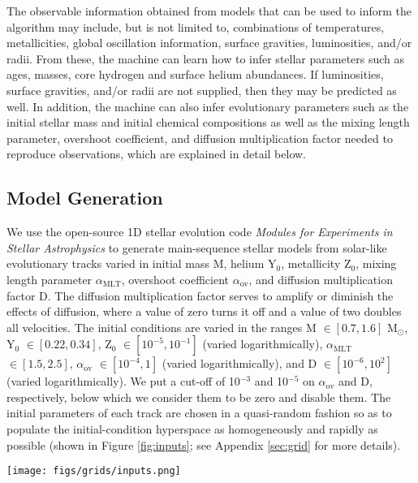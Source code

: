 \documentclass[twocolumn,twocolappendix]{aastex6}
\newif\ifref
\newcommand{\mb}[1]{\ifref\boldmath\textbf{#1}\unboldmath\else #1\fi}
\begin{document}
The \mb{observable information obtained from models that can be} used to inform the algorithm may include, but \mb{is} not limited to, combinations of temperatures, metallicities, global oscillation information, surface gravities, luminosities, and/or radii. From these, the machine can learn how to infer stellar parameters such as ages, masses, core hydrogen and surface helium abundances. If luminosities, surface gravities, and/or radii are not supplied, then they may be predicted as well. In addition, the machine can also infer evolutionary parameters such as the initial stellar mass and initial chemical compositions as well as the mixing length parameter, overshoot coefficient, and diffusion multiplication factor needed to reproduce observations, which are explained in detail below. 

\subsection{Model Generation}
\label{sec:models}
We use the open-source 1D stellar evolution code \emph{Modules for Experiments in Stellar Astrophysics} \citep[MESA;][]{Paxton2011} to generate main-sequence stellar models from solar-like evolutionary tracks varied in initial mass M, helium Y$_0$, metallicity Z$_0$, mixing length parameter $\alpha_{\text{MLT}}$, overshoot coefficient $\alpha_{\text{ov}}$, and \mb{diffusion multiplication factor} D. \mb{The diffusion multiplication factor} serves to amplify or diminish the effects of diffusion, where a value of zero turn\mb{s} it off and a value of two double\mb{s} all velocities. The initial conditions are varied in the ranges M $\in [0.7, 1.6]$ M$_\odot$, Y$_0$ $\in [0.22, 0.34]$, Z$_0$ $\in [10^{-5}, 10^{-1}]$ (varied logarithmically), $\alpha_{\text{MLT}}$ $\in [1.5, 2.5]$, $\alpha_{\text{ov}}$ $\in [10^{-4}, 1]$ (varied logarithmically), and D $\in [10^{-6}, 10^2]$ (varied logarithmically). We put a cut-off of 10$^{-3}$ and 10$^{-5}$ on $\alpha_{\text{ov}}$ and D, respectively, below which we consider them to be zero and \mb{disable them}. The initial parameters of each track are chosen in a quasi-random fashion so as to populate the initial-condition hyperspace as homogeneously and rapidly as possible (shown in Figure \ref{fig:inputs}; see Appendix \ref{sec:grid} for more details). 

\begin{figure*}
    \centering
    \texttt{[image: figs/grids/inputs.png]}
    \caption{Scatterplot matrix (lower panels) and density plots (diagonal) of evolutionary track initial conditions considered. Mass (M), initial helium (Y$_0$), initial metallicity (Z$_0$), mixing length parameter ($\alpha_{\text{MLT}}$), overshoot ($\alpha_{\text{ov}}$), and diffusion multiplication factor (D) were varied in a quasi-random fashion to obtain a low-discrepancy grid of model tracks. Points are colored by their initial hydrogen X$_0=1-$Y$_0-$Z$_0$, with \mb{black} being low X$_0$ ($\approx 56\%$) and \mb{blue} being high X$_0$ ($\approx 78\%$). The parameter space is densely populated with evolutionary tracks of maximally different initial conditions. }
    \label{fig:inputs}
\end{figure*}
\end{document}
